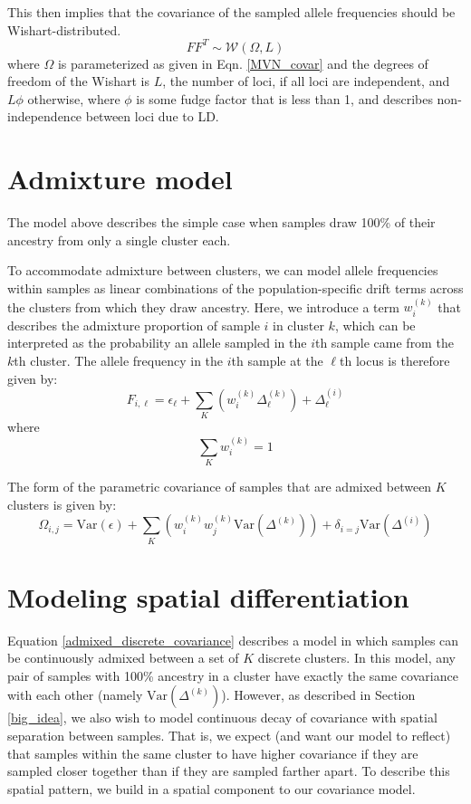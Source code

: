 \documentclass[12pt]{article}
\begin{document}
This then implies that the covariance of the sampled allele frequencies should be Wishart-distributed.
\begin{equation}
FF^{T} \sim \mathcal{W}\left( \Omega, L	\right)
\label{wishart}
\end{equation}
%
where $\Omega$ is parameterized as given in Eqn. \eqref{MVN_covar} 
and the degrees of freedom of the Wishart is $L$, the number of loci, 
if all loci are independent, and $L\phi$ otherwise, 
where $\phi$ is some fudge factor that is less than 1, 
and describes non-independence between loci due to LD.

\section{Admixture model} \label{admixture_model}
The model above describes the simple case 
when samples draw 100\% of their ancestry from only a single cluster each.

To accommodate admixture between clusters, 
we can model allele frequencies within samples as linear combinations of the population-specific 
drift terms across the clusters from which they draw ancestry.
Here, we introduce a term $w^{(k)}_{i}$ that describes the admixture proportion of sample $i$ in cluster $k$,
which can be interpreted as the probability an allele sampled in the $i$th sample came from the $k$th cluster.
The allele frequency in the $i$th sample at the $\ell$th locus is therefore given by:
%
\begin{equation}
F_{i,\ell} = \epsilon_{\ell} + \sum\limits_{K} \left( w^{(k)}_{i} \Delta^{(k)}_{\ell} \right) + \Delta^{(i)}_{\ell}	
\label{drift_terms_admix}
\end{equation}
%
where
%
\begin{equation}
\sum\limits_{K}w^{(k)}_{i} = 1
\end{equation}

The form of the parametric covariance of samples that are admixed between $K$ clusters is given by:
\begin{equation}
\Omega_{i,j} = \text{Var}(\epsilon) + \sum\limits_K \left(	w^{(k)}_iw^{(k)}_j \text{Var}(\Delta^{(k)}) 	\right) + 
\delta_{i=j} \text{Var}(\Delta^{(i)})
\label{admixed_discrete_covariance}
\end{equation}

\section{Modeling spatial differentiation}
Equation \eqref{admixed_discrete_covariance} describes a model in which 
samples can be continuously admixed between a set of $K$ discrete clusters.
In this model, any pair of samples with 100\% ancestry in a cluster 
have exactly the same covariance with each other (namely $\text{Var}(\Delta^{(k)})$).
However, as described in Section \ref{big_idea},
we also wish to model continuous decay of covariance with spatial separation between samples.
That is, we expect (and want our model to reflect) that samples within the same cluster 
to have higher covariance if they are sampled closer together than if they are sampled farther apart.
To describe this spatial pattern, we build in a spatial component to our covariance model.
\end{document}

